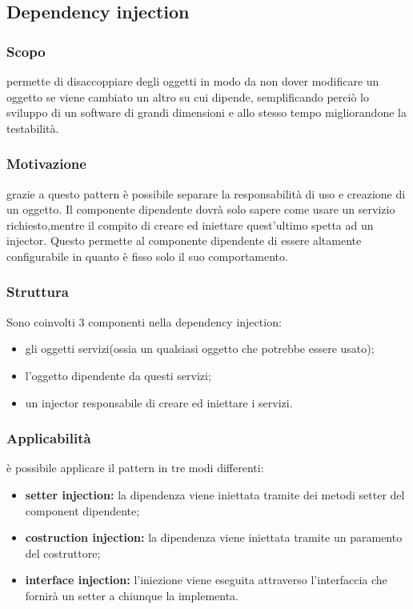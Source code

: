 


\subsection{Dependency injection}

\subsubsection{Scopo} permette di disaccoppiare degli oggetti in modo da non dover modificare un oggetto se viene cambiato un altro su cui dipende, semplificando perciò lo sviluppo di un software di grandi dimensioni e allo stesso tempo migliorandone la testabilità.

\subsubsection{Motivazione} grazie a questo pattern è possibile separare la responsabilità di uso e creazione di un oggetto. Il componente dipendente dovrà solo sapere come usare un servizio richiesto,mentre il compito di creare ed iniettare quest'ultimo spetta ad un injector. Questo permette al componente dipendente di essere altamente configurabile in quanto è fisso solo il suo comportamento.

\subsubsection{Struttura} Sono coinvolti 3 componenti nella dependency injection:
\begin{itemize}
	\item gli oggetti servizi(ossia un qualsiasi oggetto che potrebbe essere usato);
	\item l'oggetto dipendente da questi servizi;
	\item un injector responsabile di creare ed iniettare i servizi.
\end{itemize}

\subsubsection{Applicabilità} è possibile applicare il pattern in tre modi differenti:
\begin{itemize}
	\item \textbf{setter injection:} la dipendenza viene iniettata tramite dei metodi setter del component dipendente;
	\item \textbf{costruction injection:} la dipendenza viene iniettata tramite un paramento del costruttore;
	\item \textbf{interface injection:} l'iniezione viene eseguita attraverso l'interfaccia che fornirà un setter a chiunque la implementa.
\end{itemize}
